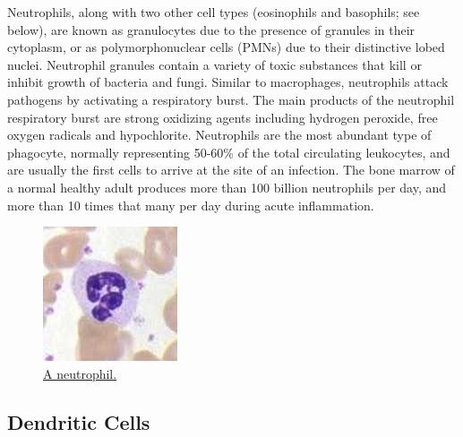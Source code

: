 Neutrophils, along with two other cell types (eosinophils and basophils; see below), are known as granulocytes due to the presence of granules in their cytoplasm, or as polymorphonuclear cells (PMNs) due to their distinctive lobed nuclei. Neutrophil granules contain a variety of toxic substances that kill or inhibit growth of bacteria and fungi. Similar to macrophages, neutrophils attack pathogens by activating a respiratory burst. The main products of the neutrophil respiratory burst are strong oxidizing agents including hydrogen peroxide, free oxygen radicals and hypochlorite. Neutrophils are the most abundant type of phagocyte, normally representing 50-60\% of the total circulating leukocytes, and are usually the first cells to arrive at the site of an infection. The bone marrow of a normal healthy adult produces more than 100 billion neutrophils per day, and more than 10 times that many per day during acute inflammation.



\begin{figure}

{\centering \includegraphics[width=0.7\linewidth]{./figures/immune/PBNeutrophil} 

}

\caption{\href{https://commons.wikimedia.org/wiki/File:PBNeutrophil.jpg}{A neutrophil.}}\label{fig:neutrophil}
\end{figure}

\hypertarget{dendritic-cells}{%
\subsection{Dendritic Cells}\label{dendritic-cells}}

